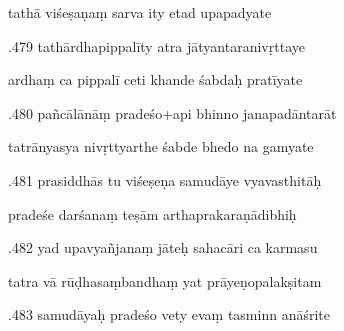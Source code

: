 \documentclass[article,12pt,a4paper]{memoir}%
\newcounter{parCount}
\begin{document}
	  
	  \pstart \leavevmode%
	tathā viśeṣaṇaṃ sarva ity etad upapadyate 
	{}
	\pend%
      

	  
	  \pstart {}.479 tathārdhapippalīty atra   jātyantaranivṛttaye 
	{}
	\pend%
      

	  
	  \pstart \leavevmode%
	ardhaṃ ca pippalī ceti khande śabdaḥ pratīyate 
	{}
	\pend%
      

	  
	  \pstart {}.480 pañcālānāṃ pradeśo+api bhinno janapadāntarāt 
	{}
	\pend%
      

	  
	  \pstart \leavevmode%
	tatrānyasya nivṛttyarthe śabde bhedo na gamyate 
	{}
	\pend%
      

	  
	  \pstart {}.481 prasiddhās tu viśeṣeṇa samudāye vyavasthitāḥ 
	{}
	\pend%
      

	  
	  \pstart \leavevmode%
	pradeśe darśanaṃ teṣām arthaprakaraṇādibhiḥ 
	{}
	\pend%
      

	  
	  \pstart {}.482 yad upavyañjanaṃ jāteḥ sahacāri ca karmasu 
	{}
	\pend%
      

	  
	  \pstart \leavevmode%
	tatra vā rūḍhasaṃbandhaṃ yat prāyeṇopalakṣitam 
	{}
	\pend%
      

	  
	  \pstart {}.483 samudāyaḥ pradeśo vety evaṃ tasminn anāśrite 
	{}
	\pend%
      
\end{document}
